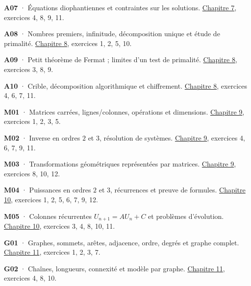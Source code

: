 \noindent\textbf{A07} · Équations diophantiennes et contraintes sur les solutions. \hyperref[chap-7]{Chapitre 7}, exercices 4, 8, 9, 11.\par\vspace{1.7mm}
\noindent\textbf{A08} · Nombres premiers, infinitude, décomposition unique et étude de primalité. \hyperref[chap-8]{Chapitre 8}, exercices 1, 2, 5, 10.\par\vspace{1.7mm}
\noindent\textbf{A09} · Petit théorème de Fermat ; limites d’un test de primalité. \hyperref[chap-8]{Chapitre 8}, exercices 3, 8, 9.\par\vspace{1.7mm}
\noindent\textbf{A10} · Crible, décomposition algorithmique et chiffrement. \hyperref[chap-8]{Chapitre 8}, exercices 4, 6, 7, 11.\par\vspace{1.7mm}
\noindent\textbf{M01} · Matrices carrées, lignes/colonnes, opérations et dimensions. \hyperref[chap-9]{Chapitre 9}, exercices 1, 2, 3, 5.\par\vspace{1.7mm}
\noindent\textbf{M02} · Inverse en ordres $2$ et $3$, résolution de systèmes. \hyperref[chap-9]{Chapitre 9}, exercices 4, 6, 7, 9, 11.\par\vspace{1.7mm}
\noindent\textbf{M03} · Transformations géométriques représentées par matrices. \hyperref[chap-9]{Chapitre 9}, exercices 8, 10, 12.\par\vspace{1.7mm}
\noindent\textbf{M04} · Puissances en ordres $2$ et $3$, récurrences et preuve de formules. \hyperref[chap-10]{Chapitre 10}, exercices 1, 2, 5, 6, 7, 9, 12.\par\vspace{1.7mm}
\noindent\textbf{M05} · Colonnes récurrentes $U_{n+1}=AU_n+C$ et problèmes d’évolution. \hyperref[chap-10]{Chapitre 10}, exercices 3, 4, 8, 10, 11.\par\vspace{1.7mm}
\noindent\textbf{G01} · Graphes, sommets, arêtes, adjacence, ordre, degrés et graphe complet. \hyperref[chap-11]{Chapitre 11}, exercices 1, 2, 3, 7.\par\vspace{1.7mm}
\noindent\textbf{G02} · Chaînes, longueurs, connexité et modèle par graphe. \hyperref[chap-11]{Chapitre 11}, exercices 4, 8, 10.\par\vspace{1.7mm}
